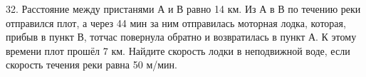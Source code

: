 32. Расстояние между пристанями А и В равно 14 км. Из А в В по течению реки отправился плот, а через 44 мин за ним отправилась моторная лодка, которая, прибыв в пункт В, тотчас повернула обратно и возвратилась в пункт А. К этому времени плот прошёл 7 км. Найдите скорость лодки в неподвижной воде, если скорость течения реки равна 50 м/мин.\\
